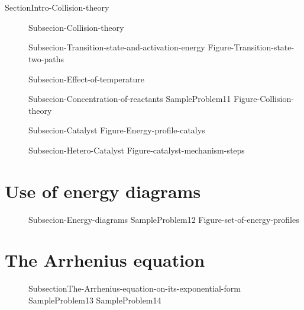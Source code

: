 \documentclass[main.tex]{subfiles}
\newcommand\chapterlabel{Ch-kinetics}\setcounter{figurenewcounter}{0}\setcounter{tablenewcounter}{0}\setcounter{formulanewcounter}{0}\chapterpicture{../{\chapterlabel}/figure1}\chapterpicturelabel{PxFuel}
\begin{document}
\section{\color{blue!30!black}{Collision theory}}{SectionIntro-Collision-theory}
\sloppy \begin{description}
\item[] {Subsecion-Collision-theory}
\item[]{Subsecion-Transition-state-and-activation-energy} 
{Figure-Transition-state-two-paths} 
\item[] {Subsecion-Effect-of-temperature} 
\item[] {Subsecion-Concentration-of-reactants}
{SampleProblem11}
 \vspace{1cm}  {Figure-Collision-theory} \newpage
\item[] {Subsecion-Catalyst}
{Figure-Energy-profile-catalys}  
\item[] {Subsecion-Hetero-Catalyst}
{Figure-catalyst-mechanism-steps}  
\end{description}

 

\section{Use of energy diagrams}
\sloppy \begin{description}
\item[] {Subsecion-Energy-diagrams}
  {SampleProblem12}
  {Figure-set-of-energy-profiles}
\end{description}


\section{The Arrhenius equation}
\sloppy \begin{description}
\item[] {SubsectionThe-Arrhenius-equation-on-its-exponential-form}
  {SampleProblem13}
  {SampleProblem14}
\end{description}
\end{document}
